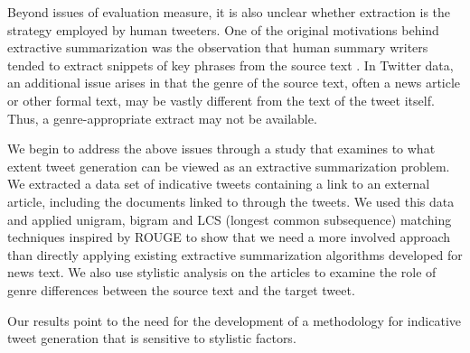 Beyond issues of evaluation measure, it is also unclear whether extraction is the strategy employed by human tweeters. One of the original motivations behind extractive summarization was the observation that human summary writers tended to extract snippets of key phrases from the source text \cite{mani-2001}. In Twitter data, an additional issue arises in that the genre of the source text, often a news article or other formal text, may be vastly different from the text of the tweet itself. Thus, a genre-appropriate extract may not be available.



We begin to address the above issues through a study that examines to what extent tweet generation can be viewed as an extractive summarization problem. We extracted a data set of indicative tweets containing a link to an external article, including the documents linked to through the tweets. We used this data and applied unigram, bigram and LCS (longest common subsequence) matching techniques inspired by ROUGE to show that we need a more involved approach than directly applying existing extractive summarization algorithms developed for news text. We also use stylistic analysis on the articles to examine the role of genre differences between the source text and the target tweet.

Our results point to the need for the development of a methodology for indicative tweet generation that is sensitive to stylistic factors. 
